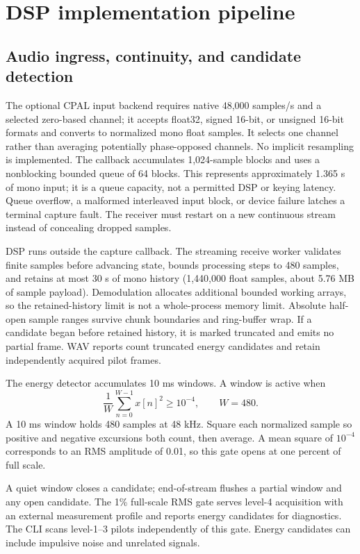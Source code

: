 \section{DSP implementation pipeline}
\label{sec:modem-dsp}

\subsection{Audio ingress, continuity, and candidate detection}
The optional CPAL input backend requires native 48,000 samples/s and a selected
zero-based channel; it accepts float32, signed 16-bit, or unsigned 16-bit
formats and converts to normalized mono float samples. It selects one channel
rather than averaging potentially phase-opposed channels. No implicit
resampling is implemented. The callback accumulates 1,024-sample blocks and
uses a nonblocking bounded queue of 64 blocks. This represents approximately
1.365 s of mono input; it is a queue capacity, not a permitted DSP or keying
latency. Queue overflow, a malformed interleaved input block, or device failure
latches a terminal capture fault. The receiver must restart on a new continuous
stream instead of concealing dropped samples.

DSP runs outside the capture callback. The streaming receive worker validates
finite samples before advancing state, bounds processing steps to 480 samples,
and retains at most 30 s of mono history (1,440,000 float samples, about
5.76 MB of sample payload). Demodulation allocates additional bounded working
arrays, so the retained-history limit is not a whole-process memory limit.
Absolute half-open sample ranges survive chunk boundaries and ring-buffer
wrap. If a candidate began before retained history, it is marked truncated and
emits no partial frame. WAV reports count truncated energy candidates and
retain independently acquired pilot frames.

The energy detector accumulates 10 ms windows. A window is active when
\[
 \frac{1}{W}\sum_{n=0}^{W-1}x[n]^2 \geq 10^{-4},\qquad W=480.
\]
A 10 ms window holds 480 samples at 48 kHz. Square each normalized
sample so positive and negative excursions both count, then average.
A mean square of $10^{-4}$ corresponds to an RMS amplitude of 0.01,
so this gate opens at one percent of full scale.

A quiet window closes a candidate; end-of-stream flushes a partial window and
any open candidate. The 1\% full-scale RMS gate serves level-4 acquisition
with an external measurement profile and reports energy candidates for
diagnostics. The CLI scans level-1--3 pilots independently of this gate.
Energy candidates can include impulsive noise and unrelated signals.

